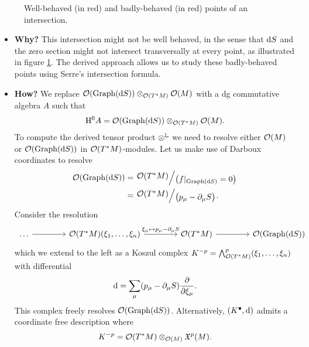 \begin{example}
\begin{figure}[ht]
    \caption{Well-behaved (in red) and badly-behaved (in red) points of an intersection.}
    \label{fig:bad_intersections}
  \end{figure}
  \begin{itemize}
    \item \textbf{Why?} This intersection might not be well behaved, in the sense that $\mathrm{d} S$ and the zero section might not intersect transversally at every point, as illustrated in figure \ref{fig:bad_intersections}. The derived approach allows us to study these badly-behaved points using Serre's intersection formula.
    \item \textbf{How?} We replace $\mathcal{O} (\operatorname{Graph}(\mathrm{d} S)) \otimes_{\mathcal{O} (T^*M)} \mathcal{O}(M)$ with a dg commutative algebra $A$ such that
    \begin{equation*}
      \mathrm{H}^0 A = \mathcal{O} (\operatorname{Graph}(\mathrm{d} S)) \otimes_{\mathcal{O} (T^*M)} \mathcal{O}(M).
    \end{equation*}
    To compute the derived tensor product $\otimes^{\mathbb{L}}$ we need to resolve either $\mathcal{O}(M)$ or $\mathcal{O}(\operatorname{Graph}(\mathrm{d} S))$ in $\mathcal{O}(T^* M)$-modules. Let us make use of Darboux coordinates to resolve
    \begin{align*}
      \Ocal(\Graph(\drm S)) &=
      \bigslant{\Ocal(T^* M)}{ \bigl( f \vert_{\Graph(\drm S)} = 0 \bigr) } \\
                            &= \bigslant{ \Ocal( T^* M )}{ \bigl( p_{\mu} - \partial_\mu S \bigr) }.
    \end{align*}
    Consider the resolution
    \begin{equation*}
      \begin{tikzcd}[column sep=4.1em]
        \dots \arrow[r] &
        \Ocal(T^* M) (\xi_1, \dots, \xi_n) \arrow[r, "\xi_{\mu} \mapsto p_{\mu} - \partial_{\mu} S"] &
        \Ocal(T^* M) \arrow[r] &
        \Ocal(\Graph(\drm S))
      \end{tikzcd}
    \end{equation*}
    which we extend to the left as a Koszul complex
    $K^{-p} = \bigwedge_{\mathcal{O}(T^* M)}^p (\xi_1, \dots, \xi_n)$
    with differential 
    \begin{equation*}
      \mathrm{d} = \sum_{\mu} (p_{\mu} - \partial_{\mu} S) \frac{\partial}{\partial \xi_{\mu}}.
    \end{equation*}
    This complex freely resolves $\mathcal{O}(\operatorname{Graph}(\mathrm{d} S))$. Alternatively, $(K^\bullet, \mathrm{d})$ admits a coordinate free description where
    \begin{equation*}
      K^{-p} = \Ocal(T^* M) \otimes_{\Ocal(M)} \Xfrak^p (M).

\end{equation*}
\end{itemize}
\end{example}
